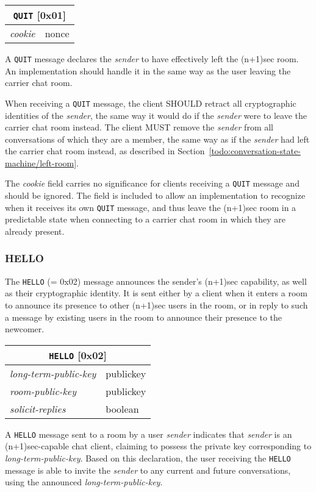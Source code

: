 \documentclass{article}
\def\message#1{\texttt{#1}}
\def\field#1{\textit{#1}}
\newenvironment{basicmessage}[2]{
\newcommand{\messagefield}[2]{
\field{##1} & \textsf{##2} \\
\hline
}
\begin{tabular}{|l|l|}
\hline
\multicolumn{2}{|c|}{\message{#1} [#2]} \\
\hline
\hline
}{
\end{tabular}
}
\begin{document}
\begin{basicmessage}{QUIT}{0x01}
\messagefield{cookie}{nonce}
\end{basicmessage}

A \message{QUIT} message declares the \field{sender} to have effectively left the (n+1)sec room.
An implementation should handle it in the same way as the user leaving the carrier chat room.

When receiving a \message{QUIT} message, the client SHOULD retract all cryptographic identities of the \field{sender}, the same way it would do if the \field{sender} were to leave the carrier chat room instead.
The client MUST remove the \field{sender} from all conversations of which they are a member, the same way as if the \field{sender} had left the carrier chat room instead, as described in Section~\ref{todo:conversation-state-machine/left-room}.

The \field{cookie} field carries no significance for clients receiving a \message{QUIT} message and should be ignored.
The field is included to allow an implementation to recognize when it receives its own \message{QUIT} message, and thus leave the (n+1)sec room in a predictable state when connecting to a carrier chat room in which they are already present.


\subsubsection{HELLO}
\label{sec:messages/hello}

The \message{HELLO} (= 0x02) message announces the sender's (n+1)sec capability, as well as their cryptographic identity.
It is sent either by a client when it enters a room to announce its presence to other (n+1)sec users in the room, or in reply to such a message by existing users in the room to announce their presence to the newcomer.

\begin{basicmessage}{HELLO}{0x02}
\messagefield{long-term-public-key}{publickey}
\messagefield{room-public-key}{publickey}
\messagefield{solicit-replies}{boolean}
\end{basicmessage}

A \message{HELLO} message sent to a room by a user \field{sender} indicates that \field{sender} is an (n+1)sec-capable chat client, claiming to possess the private key corresponding to \field{long-term-public-key}.
Based on this declaration, the user receiving the \message{HELLO} message is able to invite the \field{sender} to any current and future conversations, using the announced \field{long-term-public-key}.
\end{document}
